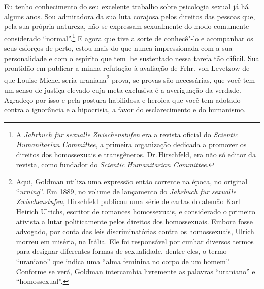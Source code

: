 Eu tenho conhecimento do seu excelente trabalho sobre psicologia sexual
já há alguns anos. Sou admiradora da sua luta corajosa pelos direitos
das pessoas que, pela sua própria natureza, não se expressam sexualmente
do modo comumente considerado ``normal''.\footnote{A \emph{Jahrbuch für
  sexualle Zwischenstufen} era a revista oficial do \emph{Scientic
  Humanitarian Committee}, a primeira organização dedicada a promover os
  direitos dos homossexuais e transgêneros. Dr.\,Hirschfeld, era não só
  editor da revista, como fundador do \emph{Scientic Humanitarian
  Committee}.} E agora que tive a sorte de conhecê"-lo e acompanhar os
seus esforços de perto, estou mais do que nunca impressionada com a sua
personalidade e com o espírito que tem lhe sustentado nessa tarefa tão
difícil. Sua prontidão em publicar a minha refutação à avaliação de
Frhr. von Levetzow de que Louise Michel seria uraniana\footnote{Aqui,
  Goldman utiliza uma expressão então corrente na época, no original
  ``\emph{urning}''. Em 1889, no volume de lançamento do \emph{Jahrbuch
  für sexualle Zwischenstufen}, Hirschfeld publicou uma série de cartas
  do alemão Karl Heirich Ulrichs, escritor de romances homossexuais, e
  considerado o primeiro ativista a lutar politicamente pelos direitos
  dos homossexuais. Embora fosse advogado, por conta das leis
  discriminatórias contra os homossexuais, Ulrich morreu em miséria, na
  Itália. Ele foi responsável por cunhar diversos termos para designar
  diferentes formas de sexualidade, dentre eles, o termo ``uraniano''
  que indica uma ``alma feminina no corpo de um homem''. Conforme se
  verá, Goldman intercambia livremente as palavras ``uraniano'' e
  ``homossexual''.} prova, se provas são necessárias, que você tem um
senso de justiça elevado cuja meta exclusiva é a averiguação da verdade.
Agradeço por isso e pela postura habilidosa e heroica que você tem
adotado contra a ignorância e a hipocrisia, a favor do esclarecimento e
do humanismo.

